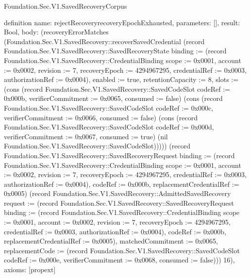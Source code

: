 \begin{lexlean}{Foundation.Sec.V1.SavedRecoveryCorpus}
\begin{semanticmodule}
definition{
  name: rejectRecoveryrecoveryEpochExhausted,
  parameters: [],
  result: Bool,
  body: (recoveryErrorMatches (Foundation.Sec.V1.SavedRecovery::recoverSavedCredential (record Foundation.Sec.V1.SavedRecovery::SavedRecoveryState {binding := (record Foundation.Sec.V1.SavedRecovery::CredentialBinding {scope := 0x0001, account := 0x0002, revision := 7, recoveryEpoch := 4294967295, credentialRef := 0x0003, authorizationRef := 0x0004}), enabled := true, retentionCapacity := 8, slots := (cons (record Foundation.Sec.V1.SavedRecovery::SavedCodeSlot {codeRef := 0x000b, verifierCommitment := 0x0065, consumed := false}) (cons (record Foundation.Sec.V1.SavedRecovery::SavedCodeSlot {codeRef := 0x000c, verifierCommitment := 0x0066, consumed := false}) (cons (record Foundation.Sec.V1.SavedRecovery::SavedCodeSlot {codeRef := 0x000d, verifierCommitment := 0x0067, consumed := true}) (nil Foundation.Sec.V1.SavedRecovery::SavedCodeSlot))))}) (record Foundation.Sec.V1.SavedRecovery::SavedRecoveryRequest {binding := (record Foundation.Sec.V1.SavedRecovery::CredentialBinding {scope := 0x0001, account := 0x0002, revision := 7, recoveryEpoch := 4294967295, credentialRef := 0x0003, authorizationRef := 0x0004}), codeRef := 0x000b, replacementCredentialRef := 0x0005}) (record Foundation.Sec.V1.SavedRecovery::AdmittedSavedRecovery {request := (record Foundation.Sec.V1.SavedRecovery::SavedRecoveryRequest {binding := (record Foundation.Sec.V1.SavedRecovery::CredentialBinding {scope := 0x0001, account := 0x0002, revision := 7, recoveryEpoch := 4294967295, credentialRef := 0x0003, authorizationRef := 0x0004}), codeRef := 0x000b, replacementCredentialRef := 0x0005}), matchedCommitment := 0x0065, replacementCode := (record Foundation.Sec.V1.SavedRecovery::SavedCodeSlot {codeRef := 0x000e, verifierCommitment := 0x0068, consumed := false})})) 16),
  axioms: [propext]
}


\end{semanticmodule}
\end{lexlean}
